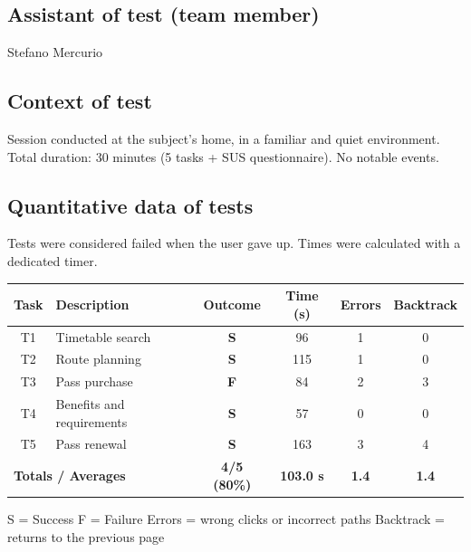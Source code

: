 ﻿\documentclass[11pt,a4paper]{article}
\begin{document}
\subsection*{Assistant of test (team member)}
\begin{tcolorbox}[base]
Stefano Mercurio
\end{tcolorbox}

\subsection*{Context of test}
\begin{tcolorbox}[base]
Session conducted at the subject's home, in a
familiar and quiet environment. Total duration: 30 minutes
(5 tasks + SUS questionnaire). No notable events.
\end{tcolorbox}

\subsection*{Quantitative data of tests}
\begin{tcolorbox}[base]
Tests were considered failed when the user gave up.
Times were calculated with a dedicated timer.
\begin{center}
\renewcommand{\arraystretch}{1.4}
\begin{tabular}{clcccc}
\toprule
\textbf{Task} & \textbf{Description} &
\textbf{Outcome} & \textbf{Time (s)} &
\textbf{Errors} & \textbf{Backtrack} \\
\midrule
T1 & Timetable search           & \textbf{S} & 96  & 1 & 0 \\
T2 & Route planning              & \textbf{S} & 115 & 1 & 0 \\
T3 & Pass purchase                & \textbf{F} & 84  & 2 & 3 \\
T4 & Benefits and requirements   & \textbf{S} & 57  & 0 & 0 \\
T5 & Pass renewal                 & \textbf{S} & 163 & 3 & 4 \\
\midrule
\multicolumn{2}{l}{\textbf{Totals / Averages}} &
\textbf{4/5 (80\%)} & \textbf{103.0 s} &
\textbf{1.4} & \textbf{1.4} \\
\bottomrule
\end{tabular}
\end{center}

\vspace{0.3cm}
\small S = Success \quad F = Failure \quad
Errors = wrong clicks or incorrect paths \quad
Backtrack = returns to the previous page
\end{tcolorbox}
\end{document}
